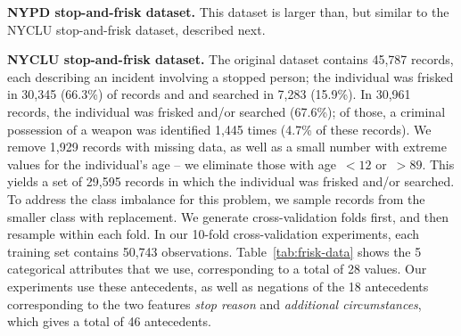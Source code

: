 \textbf{NYPD stop-and-frisk dataset.} This dataset is larger than, but similar to the
NYCLU stop-and-frisk dataset, described next.

\newpage
\textbf{NYCLU stop-and-frisk dataset.} The original dataset contains 45,787 records,
each describing an incident involving a stopped person; the individual
was frisked in 30,345 (66.3\%) of records and and searched in 7,283 (15.9\%).
%
In 30,961 records, the individual was frisked and/or searched (67.6\%); of those,
a criminal possession of a weapon was identified 1,445 times (4.7\% of these records).
%
We remove 1,929 records with missing data, as well as a small number with extreme values
for the individual's age -- we eliminate those with age~${< 12}$ or~${>89}$.
%
This yields a set of 29,595 records in which the individual was frisked and/or searched.
%
To address the class imbalance for this problem, we sample records from the
smaller class with replacement.
%
We generate cross-validation folds first, and then resample within each fold.
%
In our 10-fold cross-validation experiments, each training set contains 50,743 observations.
%
Table~\ref{tab:frisk-data} shows the 5 categorical attributes that we use,
corresponding to a total of 28 values.
%
Our experiments use these antecedents,
as well as negations of the 18 antecedents corresponding to the two features
\emph{stop reason} and \emph{additional circumstances},
which gives a total of 46 antecedents.

